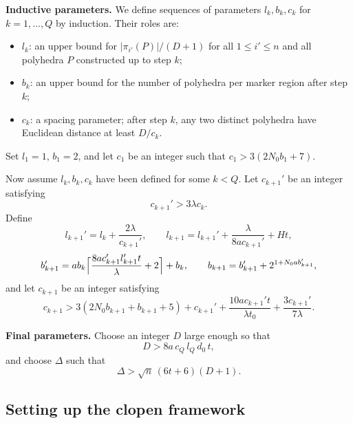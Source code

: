 \documentclass[10pt,a4paper]{amsart}
\begin{document}
\medskip\noindent
\textbf{Inductive parameters.}
We define sequences of parameters $l_k, b_k, c_k$ for $k=1,\dots, Q$ by
induction. Their roles are:
\begin{itemize}
\item $l_k$: an upper bound for $|\pi_{i'}(P)|/(D+1)$ for all
$1\leq i'\leq n$ and all polyhedra $P$ constructed up to step $k$;
\item $b_k$: an upper bound for the number of polyhedra per marker
region after step $k$;
\item $c_k$: a spacing parameter; after step $k$, any two distinct
polyhedra have Euclidean distance at least $D/c_k$.
\end{itemize}

Set $l_1=1$, $b_1=2$, and let $c_1$ be an integer such that
$c_1>3(2N_0b_1+7)$.

Now assume $l_k, b_k, c_k$ have been defined for some $k<Q$. Let
$c_{k+1}'$ be an integer satisfying
\begin{equation}\label{eq:cprime}
c_{k+1}'>3\lambda c_k.
\end{equation}
Define
\begin{equation}\label{eq:l}
l_{k+1}' = l_k + \frac{2\lambda}{c_{k+1}'},\qquad
l_{k+1} = l_{k+1}' + \frac{\lambda}{8a c_{k+1}'} + H t,
\end{equation}
\begin{equation}\label{eq:b}
b_{k+1}' = a b_k
\Bigl\lceil \frac{8a c_{k+1}' l_{k+1}' t}{\lambda}+2 \Bigr\rceil
+ b_k,\qquad
b_{k+1} = b_{k+1}' + 2^{1+N_0 a b_{k+1}'},
\end{equation}
and let $c_{k+1}$ be an integer satisfying
\begin{equation}\label{eq:c}
c_{k+1} > 3(2N_0b_{k+1}+b_{k+1}+5) + c_{k+1}'
+ \frac{10a c_{k+1}' t}{\lambda t_0}
+ \frac{3c_{k+1}'}{7\lambda}.
\end{equation}

\medskip\noindent
\textbf{Final parameters.}
Choose an integer $D$ large enough so that
\begin{equation}\label{eq:D}
D > 8a\, c_Q\, l_Q\, d_0\, t,
\end{equation}
and choose $\Delta$ such that
\begin{equation}\label{eq:Delta}
\Delta > \sqrt{n}\,(6t+6)(D+1).
\end{equation}

\subsection{Setting up the clopen framework}
\end{document}
